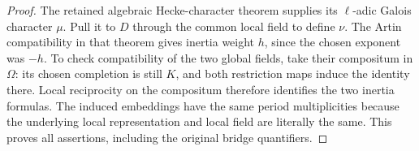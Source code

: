 \begin{proof}
The retained algebraic Hecke-character theorem supplies its
\(\ell\)-adic Galois character \(\mu\).  Pull it to \(D\)
through the common local field to define \(\nu\).  The Artin
compatibility in that theorem gives inertia weight \(h\), since
the chosen exponent was \(-h\).  To check compatibility of the
two global fields, take their compositum in \(\Omega\): its
chosen completion is still \(K\), and both restriction maps
induce the identity there.  Local reciprocity on the compositum
therefore identifies the two inertia formulas.  The induced
embeddings have the same period multiplicities because the
underlying local representation and local field are literally the
same.  This proves all assertions, including the original bridge
quantifiers.
\end{proof}

